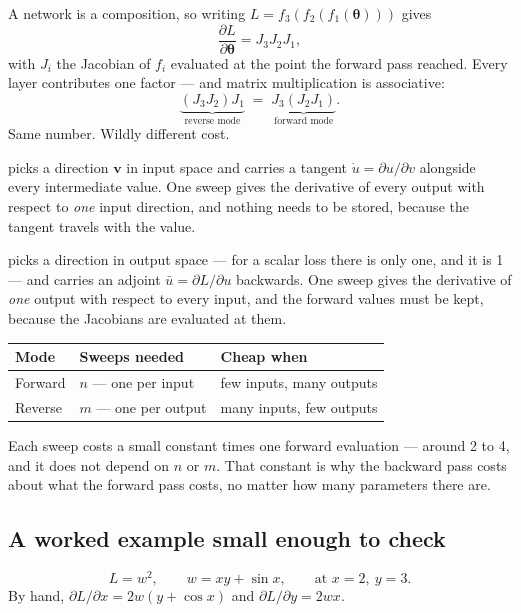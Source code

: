 \documentclass[11pt,a4paper]{article}
\begin{document}
A network is a composition, so writing
$L = f_3(f_2(f_1(\boldsymbol\theta)))$ gives
\[ \frac{\partial L}{\partial\boldsymbol\theta} = J_3 J_2 J_1, \]
with $J_i$ the Jacobian of $f_i$ evaluated at the point the forward pass
reached. Every layer contributes one factor --- and matrix multiplication is
associative:
\[ \underbrace{(J_3 J_2) J_1}_{\text{reverse mode}}
   \;=\;
   \underbrace{J_3 (J_2 J_1)}_{\text{forward mode}}. \]
Same number. Wildly different cost.

 picks a direction $\mathbf{v}$ in input space and carries a
tangent $\dot u = \partial u/\partial v$ alongside every intermediate value.
One sweep gives the derivative of every output with respect to \emph{one} input
direction, and nothing needs to be stored, because the tangent travels with the
value.

 picks a direction in output space --- for a scalar loss
there is only one, and it is 1 --- and carries an adjoint
$\bar u = \partial L/\partial u$ backwards. One sweep gives the derivative of
\emph{one} output with respect to every input, and the forward values must be
kept, because the Jacobians are evaluated at them.

\begin{center}
\small
\begin{tabular}{lll}
\toprule
\textbf{Mode} & \textbf{Sweeps needed} & \textbf{Cheap when} \\
\midrule
Forward & $n$ --- one per input & few inputs, many outputs \\
Reverse & $m$ --- one per output & many inputs, few outputs \\
\bottomrule
\end{tabular}
\end{center}

Each sweep costs a small constant times one forward evaluation --- around 2 to
4, and it does not depend on $n$ or $m$. That constant is why the backward pass
costs about what the forward pass costs, no matter how many parameters there
are.

\subsection{A worked example small enough to check}

\[ L = w^2, \qquad w = xy + \sin x, \qquad \text{at } x = 2,\ y = 3. \]
By hand, $\partial L/\partial x = 2w(y + \cos x)$ and
$\partial L/\partial y = 2wx$.
\end{document}
